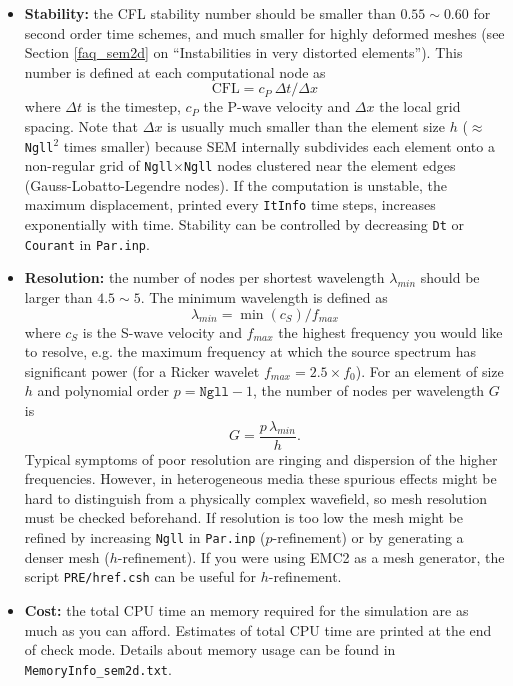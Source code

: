 \begin{itemize}

\item {\bf Stability:}
the CFL stability number should be smaller than $0.55 \sim 0.60$ for second order time schemes,
and much smaller for highly deformed meshes (see Section \ref{faq_sem2d} on
``Instabilities in very distorted elements'').
This number is defined at each computational node as $$\mbox{CFL} = c_P\ \Delta t /\Delta x$$
where $\Delta t$ is the timestep, 
$c_P$ the P-wave velocity and $\Delta x$ the local grid spacing. 
Note that $\Delta x$ is usually much smaller than the element size $h$
($\approx$ \texttt{Ngll}$^2$ times smaller)
because SEM internally subdivides each element onto a non-regular
grid of \texttt{Ngll$\times$Ngll} nodes clustered near the element edges
(Gauss-Lobatto-Legendre nodes).
If the computation is unstable, the maximum displacement,
printed every \texttt{ItInfo} time steps, increases exponentially with time.
Stability can be controlled by decreasing \texttt{Dt} 
or \texttt{Courant} in \texttt{Par.inp}.

\item {\bf Resolution:}
the number of nodes per shortest wavelength $\lambda_{min}$ should be larger than $4.5 \sim 5$.
The minimum wavelength is defined as
$$\lambda_{min}=\min(c_S)/f_{max}$$ 
where $c_S$ is the S-wave velocity and 
$f_{max}$ the highest frequency you would like to resolve, 
e.g. the maximum frequency at which the source spectrum has significant power
(for a Ricker wavelet $f_{max} = 2.5\times f_0$).
For an element of size $h$ 
and polynomial order $p=\texttt{Ngll}-1$, the number of nodes per wavelength $G$
is $$G = \frac{p\,\lambda_{min}}{h}.$$
Typical symptoms of poor resolution are ringing and dispersion of the higher frequencies.
However, in heterogeneous media
these spurious effects might be hard to distinguish from a physically complex wavefield,
so mesh resolution must be checked beforehand. 
If resolution is too low the mesh might be refined by 
increasing \texttt{Ngll} in \texttt{Par.inp} ($p$-refinement) 
or by generating a denser mesh ($h$-refinement).
If you were using EMC2 as a mesh generator,
the script \texttt{PRE/href.csh} can be useful for $h$-refinement.

\item {\bf Cost:}
the total CPU time an memory 
required for the simulation are as much as you can afford.
Estimates of total CPU time are printed at the end of check mode.
Details about memory usage can be found in \texttt{MemoryInfo\_sem2d.txt}.

\end{itemize}

